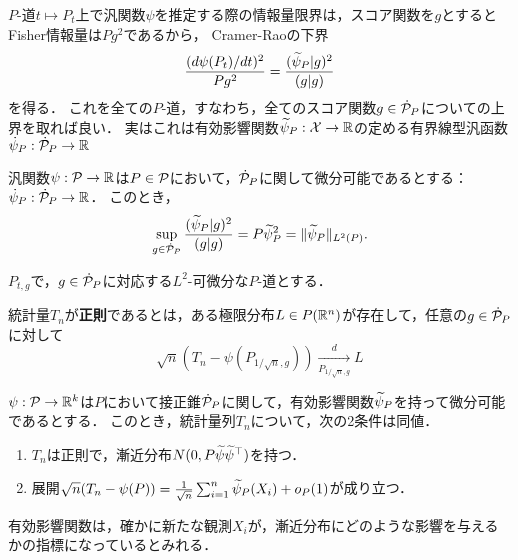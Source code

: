 \documentclass[uplatex,dvipdfmx]{jsreport}
\begin{document}
\begin{discussion}
    $P$-道$t\mapsto P_t$上で汎関数$\psi$を推定する際の情報量限界は，スコア関数を$g$とするとFisher情報量は$Pg^2$であるから，
    Cramer-Raoの下界
    \[\frac{(d\psi(P_t)/dt)^2}{Pg^2}=\frac{(\wt{\psi}_P|g)^2}{(g|g)}\]
    を得る．
    これを全ての$P$-道，すなわち，全てのスコア関数$g\in\dot{\P}_P$についての上界を取れば良い．
    実はこれは有効影響関数$\wt{\psi}_P:\X\to\R$の定める有界線型汎函数$\dot{\psi}_P:\dot{\P}_P\to\R$
\end{discussion}

\begin{proposition}
    汎関数$\psi:\P\to\R$は$P\in\P$において，$\dot{\P}_P$に関して微分可能であるとする：$\dot{\psi}_P:\dot{\P}_P\to\R$．
    このとき，
    \[\sup_{g\in\dot{\P}_P}\frac{(\wt{\psi}_P|g)^2}{(g|g)}=P\wt{\psi}_P^2=\norm{\wt{\psi}_P}_{L^2(P)}.\]
\end{proposition}

\begin{notation}
    $P_{t,g}$で，$g\in\dot{\P}_P$に対応する$L^2$-可微分な$P$-道とする．
\end{notation}

\begin{definition}
    統計量$T_n$が\textbf{正則}であるとは，ある極限分布$L\in P(\R^n)$が存在して，任意の$g\in\dot{\P}_P$に対して
    \[\sqrt{n}(T_n-\psi(P_{1/\sqrt{n},g}))\xrightarrow[P_{1/\sqrt{n},g}]{d}L\]
\end{definition}

\begin{theorem}[畳み込み定理]
    
\end{theorem}

\begin{theorem}[LAM]
    
\end{theorem}

\begin{lemma}[正規な統計量が最適であるための必要十分条件]
    $\psi:\P\to\R^k$は$P$において接正錐$\dot{\P}_P$に関して，有効影響関数$\wt{\psi}_P$を持って微分可能であるとする．
    このとき，統計量列$T_n$について，次の2条件は同値．
    \begin{enumerate}
        \item $T_n$は正則で，漸近分布$N(0,P\wt{\psi}\wt{\psi}^\top)$を持つ．
        \item 展開$\sqrt{n}(T_n-\psi(P))=\frac{1}{\sqrt{n}}\sum_{i=1}^n\wt{\psi}_P(X_i)+o_P(1)$が成り立つ．
    \end{enumerate}
\end{lemma}
\begin{remarks}
    有効影響関数は，確かに新たな観測$X_i$が，漸近分布にどのような影響を与えるかの指標になっているとみれる．
\end{remarks}
\end{document}
